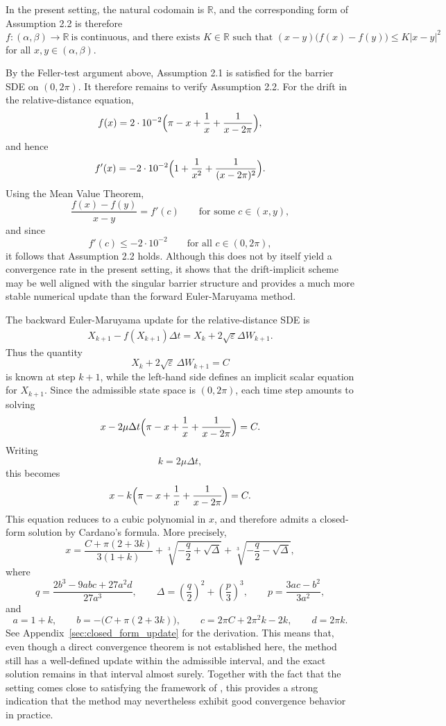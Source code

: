 \documentclass[11pt]{article}
\newcommand{\1}{\mathbbm{1}}
\theoremstyle{plain}
\theoremstyle{definition}
\theoremstyle{remark}
\begin{document}
In the present setting, the natural codomain is $\mathbb{R}$, and the corresponding form of Assumption 2.2 is therefore
\[
f:(\alpha,\beta)\to\mathbb{R}\ \text{is continuous, and there exists } K\in\mathbb{R}
\text{ such that }
(x-y)\bigl(f(x)-f(y)\bigr)\le K|x-y|^2
\]
for all $x,y\in(\alpha,\beta)$.

By the Feller-test argument above, Assumption 2.1 is satisfied for the barrier SDE on $(0,2\pi)$. It therefore remains to verify Assumption 2.2. For the drift in the relative-distance equation,
\[
f(x)=2\cdot 10^{-2}\Bigl(\pi-x+\frac{1}{x}+\frac{1}{x-2\pi}\Bigr),
\]
and hence
\[
f'(x)=-2\cdot 10^{-2}\Bigl(1+\frac{1}{x^2}+\frac{1}{(x-2\pi)^2}\Bigr).
\]
Using the Mean Value Theorem,
\[
\frac{f(x)-f(y)}{x-y}=f'(c)\qquad \text{for some } c\in(x,y),
\]
and since
\[
f'(c)\le -2\cdot 10^{-2}\qquad \text{for all } c\in(0,2\pi),
\]
it follows that Assumption 2.2 holds. Although this does not by itself yield a convergence rate in the present setting, it shows that the drift-implicit scheme may be well aligned with the singular barrier structure and provides a much more stable numerical update than the forward Euler-Maruyama method.

The backward Euler-Maruyama update for the relative-distance SDE is
\begin{align}
X_{k+1}-f(X_{k+1})\Delta t =X_k+2\sqrt{\varepsilon} \Delta W_{k+1}.
\label{eq:backward-Euler-Maruyama/drift-implicit}
\end{align}
Thus the quantity
\[
X_k+2\sqrt{\varepsilon}\,\Delta W_{k+1}=C
\]
is known at step $k+1$, while the left-hand side defines an implicit scalar equation for $X_{k+1}$. Since the admissible state space is $(0,2\pi)$, each time step amounts to solving
\begin{align}
x-2\mu \Delta t\Bigl(\pi-x+\frac{1}{x}+\frac{1}{x-2\pi}\Bigr)=C.
\label{eq:backward-update-specific}
\end{align}
Writing
\[
k=2\mu \Delta t,
\]
this becomes
\[
x-k\Bigl(\pi-x+\frac{1}{x}+\frac{1}{x-2\pi}\Bigr)=C.
\]
This equation reduces to a cubic polynomial in $x$, and therefore admits a closed-form solution by Cardano's formula. More precisely,
\[
x=
\frac{C+\pi(2+3k)}{3(1+k)}
+\sqrt[3]{-\frac{q}{2}+\sqrt{\Delta}}
+\sqrt[3]{-\frac{q}{2}-\sqrt{\Delta}},
\]
where
\[
q=\frac{2b^3-9abc+27a^2d}{27a^3},
\qquad
\Delta=\left(\frac{q}{2}\right)^2+\left(\frac{p}{3}\right)^3,
\qquad
p=\frac{3ac-b^2}{3a^2},
\]
and
\[
a=1+k,\qquad
b=-\bigl(C+\pi(2+3k)\bigr),\qquad
c=2\pi C+2\pi^2k-2k,\qquad
d=2\pi k.
\]
See Appendix~\ref{sec:closed_form_update} for the derivation. This means that, even though a direct convergence theorem is not established here, the method still has a well-defined update within the admissible interval, and the exact solution remains in that interval almost surely. Together with the fact that the setting comes close to satisfying the framework of \cite{neuenkirch2014domain}, this provides a strong indication that the method may nevertheless exhibit good convergence behavior in practice.
\end{document}
